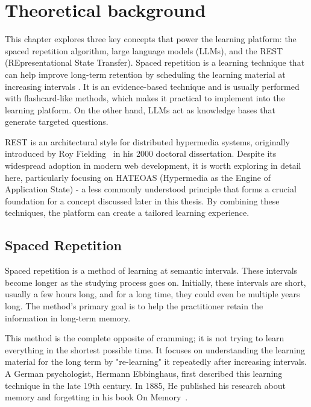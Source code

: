 \chapter{Theoretical background}\label{ch:theoretical-background}

This chapter explores three key concepts that power the learning platform: the spaced repetition algorithm, large language models (LLMs), and the REST (REpresentational State Transfer). Spaced repetition is a learning technique that can help improve long-term retention by scheduling the learning material at increasing intervals \cite{ebbinghaus1964memory}. It is an evidence-based technique and is usually performed with flashcard-like methods, which makes it practical to implement into the learning platform. On the other hand, LLMs act as knowledge bases that generate targeted questions.

REST is an architectural style for distributed hypermedia systems, originally introduced by Roy Fielding~\cite{fielding2000} in his 2000 doctoral dissertation. Despite its widespread adoption in modern web development, it is worth exploring in detail here, particularly focusing on HATEOAS (Hypermedia as the Engine of Application State) - a less commonly understood principle that forms a crucial foundation for a concept discussed later in this thesis. By combining these techniques, the platform can create a tailored learning experience.

\section{Spaced Repetition}

Spaced repetition is a method of learning at semantic intervals. These intervals become longer as the studying process goes on. Initially, these intervals are short, usually a few hours long, and for a long time, they could even be multiple years long. The method's primary goal is to help the practitioner retain the information in long-term memory.

This method is the complete opposite of cramming; it is not trying to learn everything in the shortest possible time. It focuses on understanding the learning material for the long term by "re-learning" it repeatedly after increasing intervals. A German psychologist, Hermann Ebbinghaus, first described this learning technique in the late 19th century. In 1885, He published his research about memory and forgetting in his book On Memory~\cite{ebbinghaus1964memory}.

